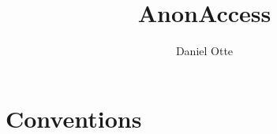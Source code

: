 \documentclass[10pt,a4paper]{article}
\author{Daniel Otte}
\title{AnonAccess}
\begin{document}
\maketitle
\section{Conventions}


\end{document}
